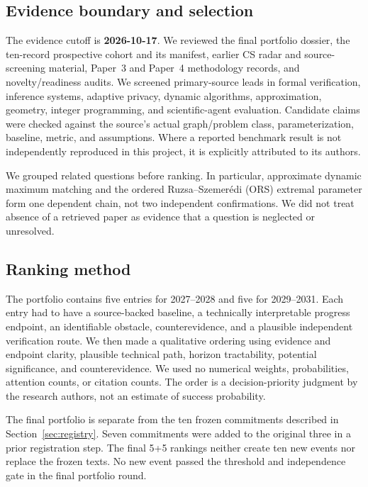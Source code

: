 \documentclass[11pt]{article}
\begin{document}
\subsection{Evidence boundary and selection}
The evidence cutoff is \textbf{2026-10-17}. We reviewed the final portfolio dossier, the ten-record prospective cohort and its manifest, earlier CS radar and source-screening material, Paper~3 and Paper~4 methodology records, and novelty/readiness audits. We screened primary-source leads in formal verification, inference systems, adaptive privacy, dynamic algorithms, approximation, geometry, integer programming, and scientific-agent evaluation. Candidate claims were checked against the source's actual graph/problem class, parameterization, baseline, metric, and assumptions. Where a reported benchmark result is not independently reproduced in this project, it is explicitly attributed to its authors.

We grouped related questions before ranking. In particular, approximate dynamic maximum matching and the ordered Ruzsa--Szemer\'edi (ORS) extremal parameter form one dependent chain, not two independent confirmations. We did not treat absence of a retrieved paper as evidence that a question is neglected or unresolved.

\subsection{Ranking method}
The portfolio contains five entries for 2027--2028 and five for 2029--2031. Each entry had to have a source-backed baseline, a technically interpretable progress endpoint, an identifiable obstacle, counterevidence, and a plausible independent verification route. We then made a qualitative ordering using evidence and endpoint clarity, plausible technical path, horizon tractability, potential significance, and counterevidence. We used no numerical weights, probabilities, attention counts, or citation counts. The order is a decision-priority judgment by the research authors, not an estimate of success probability.

The final portfolio is separate from the ten frozen commitments described in Section~\ref{sec:registry}. Seven commitments were added to the original three in a prior registration step. The final 5+5 rankings neither create ten new events nor replace the frozen texts. No new event passed the threshold and independence gate in the final portfolio round.
\end{document}
